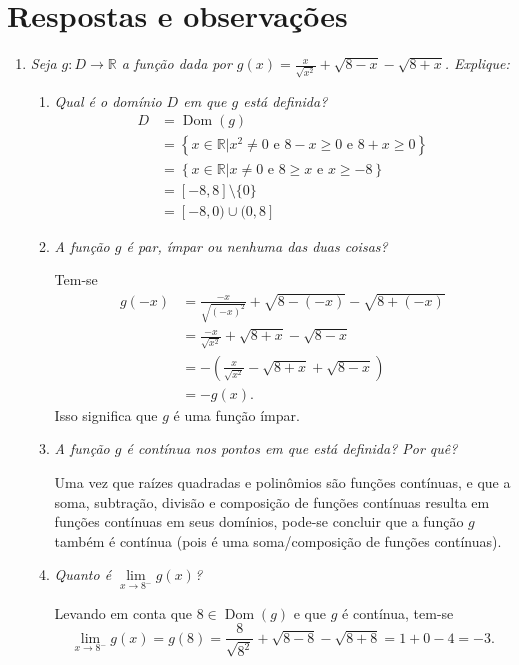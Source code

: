 \documentclass[12pt,a4paper]{article}
\begin{document}
\newpage
\restoregeometry
\section*{Respostas e observações}

\begin{enumerate}
\item \textit{ Seja $g: D \to \mathbb{R}$ a função dada por $g(x) = \frac{x}{\sqrt{x^2}} + \sqrt{8 - x} - \sqrt{8 + x}$. Explique: }
\begin{enumerate}
\item \textit{ Qual é o domínio $D$ em que $g$ está definida? }
\begin{align*}
D
& = \operatorname{Dom}(g) \\
& = \left\{ x \in \mathbb{R} | x^2 \neq 0 \text{ e } 8-x \geq 0 \text{ e } 8+x \geq 0 \right\} \\
& = \left\{ x \in \mathbb{R} | x \neq 0 \text{ e } 8 \geq x \text{ e } x \geq -8  \right\} \\
& = [-8, 8] \setminus\{ 0 \} \\
& = [-8, 0) \cup (0, 8]
\end{align*}

\item \textit{ A função $g$ é par, ímpar ou nenhuma das duas coisas? }

Tem-se
\begin{align*}
g(-x)
& = \frac{-x}{\sqrt{(-x)^2}} + \sqrt{8 - (-x)} - \sqrt{8 + (-x)} \\
& = \frac{-x}{\sqrt{x^2}} + \sqrt{8 + x} - \sqrt{8 - x} \\
& = -\left( \frac{x}{\sqrt{x^2}} - \sqrt{8 + x} + \sqrt{8 - x} \right) \\
& = -g(x).
\end{align*}
Isso significa que $g$ é uma função ímpar.

\item \textit{ A função $g$ é contínua nos pontos em que está definida? Por quê? }

Uma vez que raízes quadradas e polinômios são funções contínuas, e que a soma, subtração, divisão e composição de funções contínuas resulta em funções contínuas em seus domínios, pode-se concluir que a função $g$ também é contínua (pois é uma soma/composição de funções contínuas).

\item \textit{ Quanto é $\lim\limits_{x\to 8^-} g(x)$? }

Levando em conta que $8 \in \operatorname{Dom}(g)$ e que $g$ é contínua, tem-se
\[
\lim\limits_{x\to 8^-} g(x)
= g(8)
= \frac{8}{\sqrt{8^2}} + \sqrt{8 - 8} - \sqrt{8 + 8}
= 1 + 0 - 4 = -3.
\]


\end{enumerate}
\end{enumerate}
\end{document}
